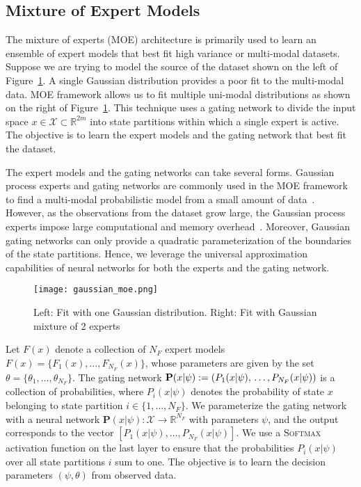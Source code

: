 \subsection{Mixture of Expert Models}
\label{ssec:mixture_of_experts}

The mixture of experts (MOE) architecture is primarily used to learn an ensemble
of expert models that best fit high variance or multi-modal datasets.
%
Suppose we are trying to model the source of the dataset shown on the left of
Figure~\ref{fig:gaussian_moe}.
%
A single Gaussian distribution provides a poor fit to the multi-modal data.
%
MOE framework allows us to fit multiple uni-modal distributions as shown on
the right of Figure~\ref{fig:gaussian_moe}.
%
This technique uses a gating network to divide the input space $x \in
\mathcal{X} \subset \mathbb{R}^{2m}$ into state partitions within which a single
expert is active.
%
The objective is to learn the expert models and the gating network that
best fit the dataset.
%

The expert models and the gating networks can take several forms. 
%
Gaussian process experts and gating networks are commonly used in the MOE
framework to find a multi-modal probabilistic model from a small amount of
data~\cite{bishop2006pattern}.
%
However, as the observations from the dataset grow large, the Gaussian process
experts impose large computational and memory
overhead~\cite{harkonen2022mixtures}.
%
Moreover, Gaussian gating networks can only provide a quadratic parameterization
of the boundaries of the state partitions.
%
Hence, we leverage the universal approximation capabilities of neural networks
for both the experts and the gating network.
%
\begin{figure}[tb]
  \centering
  \texttt{[image: gaussian\_moe.png]}
  \caption{Left: Fit with one Gaussian distribution. Right: Fit with Gaussian
  mixture of 2 experts~\cite{mcgonagle_dobre_pilling}}
  \label{fig:gaussian_moe}
\end{figure}

Let $F(x)$ denote a collection of $N_F$ expert models $F(x) = \{F_1(x),
\dots, F_{N_{F}}(x)\}$, whose parameters are given by the set
$\theta=\{\theta_1, \dots, \theta_{N_{F}} \}$.
%
%
The gating network $\mathbf{P}(x| \psi) := (P_1(x| \psi), \\ \dots, P_{N_F}(x|
\psi))$ is a collection of probabilities, where $P_i(x | \psi)$ denotes the
probability of state $x$ belonging to state partition $i \in \{1, \dots, N_F \}$. 
%
We parameterize the gating network with a neural network $\mathbf{P}(x| \psi) :
\mathcal{X} \rightarrow \mathbb{R}^{N_F}$ with parameters $\psi$, and the output
corresponds to the vector $[P_1(x| \psi), \dots, P_{N_F}(x| \psi)]$.
%
We use a \textsc{Softmax} activation function on the last layer to ensure that the
probabilities $P_i(x | \psi)$ over all state partitions $i$ sum to one.
%
The objective is to learn the decision parameters $(\psi, \theta)$ from observed
data.

